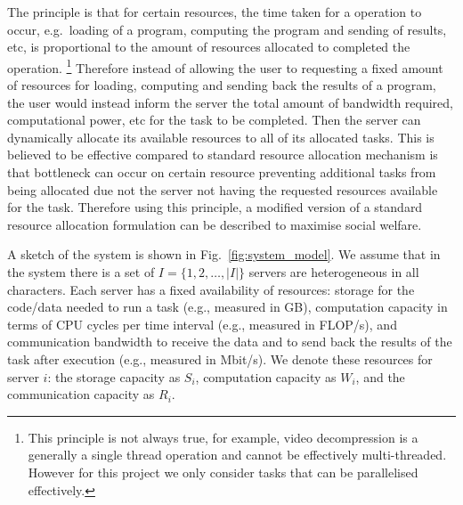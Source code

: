 The principle is that for certain resources, the time taken for a operation to occur,
e.g.\ loading of a program, computing the program and sending of results, etc, is proportional to the amount of
resources allocated to completed the operation.
\footnote{This principle is not always true, for example, video decompression is a generally a single
thread operation and cannot be effectively multi-threaded. However for this project we only consider tasks
that can be parallelised effectively.}
Therefore instead of allowing the user to requesting a fixed amount of resources for loading, computing and sending back
the results of a program, the user would instead inform the server the total amount of bandwidth required,
computational power, etc for the task to be completed. Then the server can dynamically allocate its available resources
to all of its allocated tasks.
This is believed to be effective compared to standard resource allocation mechanism is that bottleneck can occur on
certain resource preventing additional tasks from being allocated due not the server not having the requested resources
available for the task.
Therefore using this principle, a modified version of a standard resource allocation formulation can be described
to maximise social welfare.

A sketch of the system is shown in Fig.~\ref{fig:system_model}.
We assume that in the system there is a set of $I = \{1,2,\ldots,\left|I\right|\}$ servers are heterogeneous in all
characters. Each server has a fixed availability of resources: storage for the code/data needed to run a task
(e.g., measured in GB), computation capacity in terms of CPU cycles per time interval (e.g., measured in FLOP/s),
and communication bandwidth to receive the data and to send back the results of the task after execution (e.g., measured in Mbit/s).
We denote these resources for server $i$: the storage capacity as $S_i$, computation capacity as $W_i$,
and the communication capacity as $R_i$.

